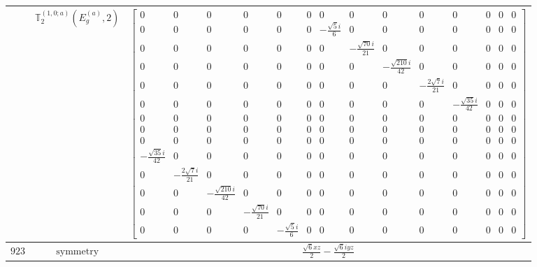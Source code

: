 \documentclass[fleqn,8pt,landscape]{jsarticle}
\begin{document}
\begin{longtable}{ccc}
$  $ & $ \mathbb{T}_{2}^{(1,0;a)}(E_{g}^{(a)},2) $ & $ \begin{bmatrix} 0 & 0 & 0 & 0 & 0 & 0 & 0 & 0 & 0 & 0 & 0 & 0 & 0 & 0 \\ 0 & 0 & 0 & 0 & 0 & 0 & - \frac{\sqrt{5} i}{6} & 0 & 0 & 0 & 0 & 0 & 0 & 0 \\ 0 & 0 & 0 & 0 & 0 & 0 & 0 & - \frac{\sqrt{70} i}{21} & 0 & 0 & 0 & 0 & 0 & 0 \\ 0 & 0 & 0 & 0 & 0 & 0 & 0 & 0 & - \frac{\sqrt{210} i}{42} & 0 & 0 & 0 & 0 & 0 \\ 0 & 0 & 0 & 0 & 0 & 0 & 0 & 0 & 0 & - \frac{2 \sqrt{7} i}{21} & 0 & 0 & 0 & 0 \\ 0 & 0 & 0 & 0 & 0 & 0 & 0 & 0 & 0 & 0 & - \frac{\sqrt{35} i}{42} & 0 & 0 & 0 \\ 0 & 0 & 0 & 0 & 0 & 0 & 0 & 0 & 0 & 0 & 0 & 0 & 0 & 0 \\ 0 & 0 & 0 & 0 & 0 & 0 & 0 & 0 & 0 & 0 & 0 & 0 & 0 & 0 \\ 0 & 0 & 0 & 0 & 0 & 0 & 0 & 0 & 0 & 0 & 0 & 0 & 0 & 0 \\ - \frac{\sqrt{35} i}{42} & 0 & 0 & 0 & 0 & 0 & 0 & 0 & 0 & 0 & 0 & 0 & 0 & 0 \\ 0 & - \frac{2 \sqrt{7} i}{21} & 0 & 0 & 0 & 0 & 0 & 0 & 0 & 0 & 0 & 0 & 0 & 0 \\ 0 & 0 & - \frac{\sqrt{210} i}{42} & 0 & 0 & 0 & 0 & 0 & 0 & 0 & 0 & 0 & 0 & 0 \\ 0 & 0 & 0 & - \frac{\sqrt{70} i}{21} & 0 & 0 & 0 & 0 & 0 & 0 & 0 & 0 & 0 & 0 \\ 0 & 0 & 0 & 0 & - \frac{\sqrt{5} i}{6} & 0 & 0 & 0 & 0 & 0 & 0 & 0 & 0 & 0 \end{bmatrix} $ \\ \hline
$ 923 $ & $ \text{symmetry} $ & $ \frac{\sqrt{6} x z}{2} - \frac{\sqrt{6} i y z}{2} $ \\

\end{longtable}
\end{document}
